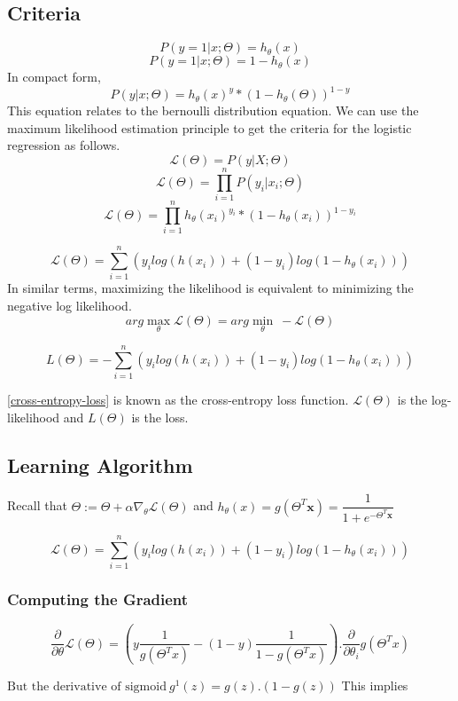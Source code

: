 \documentclass[12pt,a4paper,titlepage,portrait,openany]{book}
\begin{document}
	\subsection{Criteria}
	$$P(y = 1 | x;\Theta) = h_\theta(x)$$
	$$P(y = 1 | x;\Theta) = 1 - h_\theta(x)$$
	In compact form,
	$$P(y|x;\Theta) = h_\theta(x)^y * (1-h_\theta(\Theta))^{1-y}$$ 
	This equation relates to the bernoulli distribution equation. We can use the maximum likelihood estimation principle to get the criteria for the logistic regression as follows.
	$$\mathcal{L}(\Theta) = P(y|X;\Theta)$$
	$$\mathcal{L}(\Theta) = \prod_{i=1}^{n}P(y_i|x_i;\Theta)$$
	$$\mathcal{L}(\Theta) = \prod_{i=1}^{n}h_\theta(x_i)^{y_i} * (1-h_\theta(x_i))^{1-y_i}$$
	
	$$
		\mathcal{L}(\Theta) = \sum_{i=1}^{n}\left(y_ilog(h(x_i)) + (1-y_i)log(1-h_\theta(x_i))\right)
	$$
	In similar terms, maximizing the likelihood is equivalent to minimizing the negative log likelihood.
	$$arg\max\limits_{\theta}\mathcal{L}(\Theta) = arg\min\limits_{\theta}~-\mathcal{L}(\Theta)$$
	
	\begin{equation}\label{cross-entropy-loss}
	L(\Theta) = -\sum_{i=1}^{n}\left(y_ilog(h(x_i)) + (1-y_i)log(1-h_\theta(x_i))\right)
	\end{equation}
	
	\eqref{cross-entropy-loss} is known as the cross-entropy loss function. $\mathcal{L}(\Theta)$ is the log-likelihood and $L(\Theta)$ is the loss.
	
	\subsection{Learning Algorithm}
	Recall that $\Theta := \Theta + \alpha\nabla_\theta\mathcal{L}(\Theta)$ and $h_\theta(x) = g(\Theta^T\boldsymbol{x}) = \dfrac{1}{1+e^{-\Theta^T\boldsymbol{x}}}$
	
	$$
	\mathcal{L}(\Theta) = \sum_{i=1}^{n}\left(y_ilog(h(x_i)) + (1-y_i)log(1-h_\theta(x_i))\right)
	$$
	
	\subsubsection{Computing the Gradient}
	$$\dfrac{\partial}{\partial\theta}\mathcal{L}(\Theta) = \left(y\dfrac{1}{g(\Theta^Tx)} - (1-y)\dfrac{1}{1-g(\Theta^Tx)}\right).\dfrac{\partial}{\partial\theta_i}g(\Theta^Tx)$$
	
	$\text{But the derivative of sigmoid}~ g^1(z) = g(z).(1-g(z)) $ This implies
	
\end{document}
